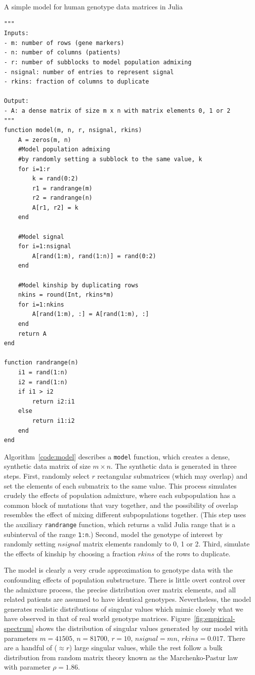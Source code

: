 \documentclass[review]{siamart0516}
\begin{document}
\begin{algorithm}
\caption{A simple model for human genotype data matrices in Julia
\label{code:model}}
\begin{lstlisting}
"""
Inputs:
- m: number of rows (gene markers)
- n: number of columns (patients)
- r: number of subblocks to model population admixing
- nsignal: number of entries to represent signal
- rkins: fraction of columns to duplicate

Output:
- A: a dense matrix of size m x n with matrix elements 0, 1 or 2
"""
function model(m, n, r, nsignal, rkins)
    A = zeros(m, n)
    #Model population admixing
    #by randomly setting a subblock to the same value, k
    for i=1:r
        k = rand(0:2)
        r1 = randrange(m)
        r2 = randrange(n)
        A[r1, r2] = k
    end

    #Model signal
    for i=1:nsignal
        A[rand(1:m), rand(1:n)] = rand(0:2)
    end

    #Model kinship by duplicating rows
    nkins = round(Int, rkins*m)
    for i=1:nkins
        A[rand(1:m), :] = A[rand(1:m), :]
    end
    return A
end

function randrange(n)
    i1 = rand(1:n)
    i2 = rand(1:n)
    if i1 > i2
        return i2:i1
    else
        return i1:i2
    end
end
\end{lstlisting}
\end{algorithm}

Algorithm~\ref{code:model} describes a \verb|model| function, which creates a
dense, synthetic data matrix of size $m\times n$. The synthetic data is
generated in three steps. First, randomly select $r$ rectangular submatrices
(which may overlap) and set the elements of each submatrix to the same value.
This process simulates crudely the effects of population admixture, where
each subpopulation has a common block of mutations that vary together, and the
possibility of overlap resembles the effect of mixing different subpopulations
together. (This step uses the auxiliary \verb|randrange| function, which returns
a valid Julia range that is a subinterval of the range \verb|1:n|.)
Second, model the genotype of interest by randomly setting $nsignal$ matrix
elements randomly to 0, 1 or 2.
Third, simulate the effects of kinship by choosing a fraction $rkins$ of the
rows to duplicate.

The model is clearly a very crude approximation to genotype data with the
confounding effects of population substructure. There is little overt control
over the admixture process, the precise distribution over matrix elements, and
all related patients are assumed to have identical genotypes. Nevertheless, the
model generates realistic distributions of singular values which mimic closely
what we have observed in that of real world genotype matrices.
Figure~\ref{fig:empirical-spectrum} shows the distribution of singular values
generated by our model with parameters $m=41505$, $n=81700$, $r=10$,
$nsignal=mn$, $rkins=0.017$.
There are a handful of ($\approx r$) large singular values,
while the rest follow a bulk distribution from random matrix theory known as the
Marchenko-Pastur law~\cite{Marchenko1967} with parameter $\rho = 1.86$.
\end{document}
